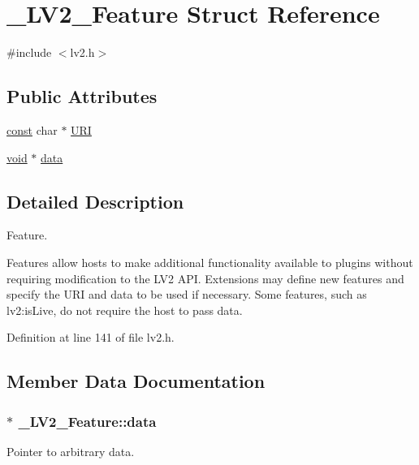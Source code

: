 \hypertarget{struct___l_v2___feature}{}\section{\+\_\+\+L\+V2\+\_\+\+Feature Struct Reference}
\label{struct___l_v2___feature}


{\ttfamily \#include $<$lv2.\+h$>$}

\subsection*{Public Attributes}
\begin{DoxyCompactItemize}
\item 
\hyperlink{getopt1_8c_a2c212835823e3c54a8ab6d95c652660e}{const} char $\ast$ \hyperlink{struct___l_v2___feature_a9ac77cf6137eb6fc6bc33456fceb4b4c}{U\+RI}
\item 
\hyperlink{sound_8c_ae35f5844602719cf66324f4de2a658b3}{void} $\ast$ \hyperlink{struct___l_v2___feature_af540261bcab5188074b6657c34b2c723}{data}
\end{DoxyCompactItemize}


\subsection{Detailed Description}
Feature.

Features allow hosts to make additional functionality available to plugins without requiring modification to the L\+V2 A\+PI. Extensions may define new features and specify the {\ttfamily U\+RI} and {\ttfamily data} to be used if necessary. Some features, such as lv2\+:is\+Live, do not require the host to pass data. 

Definition at line 141 of file lv2.\+h.



\subsection{Member Data Documentation}
\subsubsection[{\texorpdfstring{data}{data}}]{$\ast$ \+\_\+\+L\+V2\+\_\+\+Feature\+::data}\hypertarget{struct___l_v2___feature_af540261bcab5188074b6657c34b2c723}{}\label{struct___l_v2___feature_af540261bcab5188074b6657c34b2c723}
Pointer to arbitrary data.

